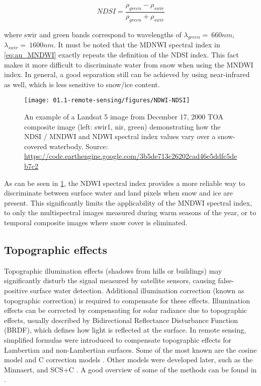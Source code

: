 \begin{equation}
NDSI=\frac{\rho_{green}-\rho_{swir}}{\rho_{green}+\rho_{swir}}
\end{equation}

where swir and green bands correspond to wavelengths of $\lambda_{green}=~660nm$, $\lambda_{swir}=~1600nm$. It must be noted that the MDNWI spectral index in \ref{eq:au_MNDWI} exactly repeats the definition of the NDSI index. This fact makes it more difficult to discriminate water from snow when using the MNDWI index. In general, a good separation still can be achieved by using near-infrared as well, which is less sensitive to snow/ice content.

\begin{figure}[H]
	\texttt{[image: 01.1-remote-sensing/figures/NDWI-NDSI]}
	\caption{An example of a Landsat 5 image from December 17, 2000 TOA composite image (left: swir1, nir, green) demonstrating how the NDSI / MNDWI and NDWI spectral index values vary over a snow-covered waterbody. Source: \url{https://code.earthengine.google.com/3b5de713c26202cad46e5ddfc5deb7c2}}
	\label{fig:snow}
\end{figure}

As can be seen in \ref{fig:snow}, the NDWI spectral index provides a more reliable way to discriminate between surface water and land pixels when snow and ice are present. This significantly limits the applicability of the MNDWI spectral index, to only the multispectral images measured during warm seasons of the year, or to temporal composite images where snow cover is eliminated.

\subsection{Topographic effects}

Topographic illumination effects (shadows from hills or buildings) may significantly disturb the signal measured by satellite sensors, causing false-positive surface water detection. Additional illumination correction (known as topographic correction) is required to compensate for these effects. Illumination effects can be corrected by compensating for solar radiance due to topographic effects, usually described by Bidirectional Reflectance Disturbance Function (BRDF), which defines how light is reflected at the surface. In remote sensing, simplified formulas were introduced to compensate topographic effects for Lambertian and non-Lambertian surfaces. Some of the most known are the cosine model and C correction models \citet{teillet1982slope}. Other models were developed later, such as the Minnaert, and SCS+C \citet{smith1980lambertian, teillet1982slope}. A good overview of some of the methods can be found in \citet{gao2009simple, soenen2005scs+}. 


